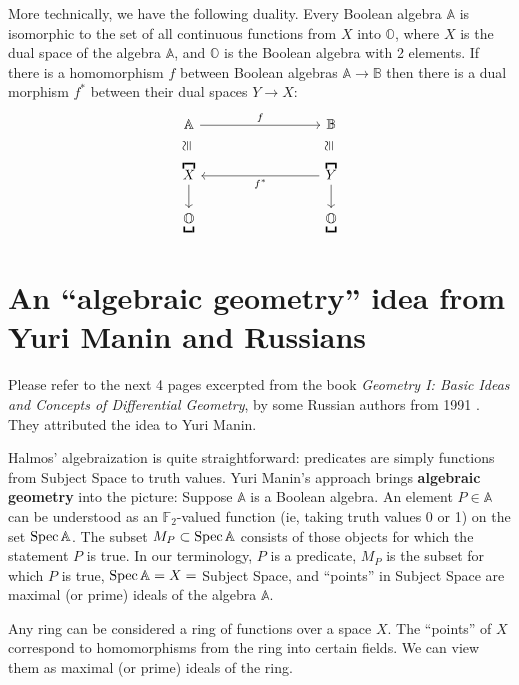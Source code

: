 More technically, we have the following duality.  Every Boolean algebra $\mathbb{A}$ is isomorphic to the set of all continuous functions from $X$ into $\mathbb{O}$, where $X$ is the dual space of the algebra $\mathbb{A}$, and $\mathbb{O}$ is the Boolean algebra with 2 elements.  If there is a homomorphism $f$ between Boolean algebras $\mathbb{A} \rightarrow \mathbb{B}$ then there is a dual morphism $f^*$ between their dual spaces $Y \rightarrow X$:
\begin{equation}
\begin{tikzcd}[column sep=3cm, row sep=0.6cm]
\mathbb{A} \arrow[r,"f"] \arrow[d,shift left=2,phantom,"\cong"{anchor=south,rotate=90}] & \mathbb{B} \arrow[d,shift left=2,phantom,"\cong"{anchor=south,rotate=90}] \\
\overbracket{X} \arrow[d] & \overbracket{Y} \arrow[d] \arrow[l,"f^*"] \\
\underbracket{\mathbb{O}} & \underbracket{\mathbb{O}} 
\end{tikzcd}
\end{equation}

\section{An ``algebraic geometry'' idea from Yuri Manin and Russians}

Please refer to the next 4 pages excerpted from the book \textit{Geometry I: Basic Ideas and Concepts of Differential Geometry}, by some Russian authors from 1991 \cite{Alekseevskij1991}.  They attributed the idea to Yuri Manin.

Halmos' algebraization is quite straightforward:  predicates are simply functions from Subject Space to truth values.  Yuri Manin's approach brings \textbf{algebraic geometry} into the picture:  Suppose $\mathbb{A}$ is a Boolean algebra.  An element $P \in \mathbb{A}$ can be understood as an $\mathbb{F}_2$-valued function (ie, taking truth values 0 or 1) on the set $\operatorname{Spec} \mathbb{A}$.  The subset $M_P \subset \operatorname{Spec} \mathbb{A}$ consists of those objects for which the statement $P$ is true.  In our terminology, $P$ is a predicate, $M_P$ is the subset for which $P$ is true, $\operatorname{Spec} \mathbb{A} = X =$ Subject Space, and ``points'' in Subject Space are maximal (or prime) ideals of the algebra $\mathbb{A}$.

Any ring can be considered a ring of functions over a space $X$.  The ``points'' of $X$ correspond to homomorphisms from the ring into certain fields.  We can view them as maximal (or prime) ideals of the ring.

